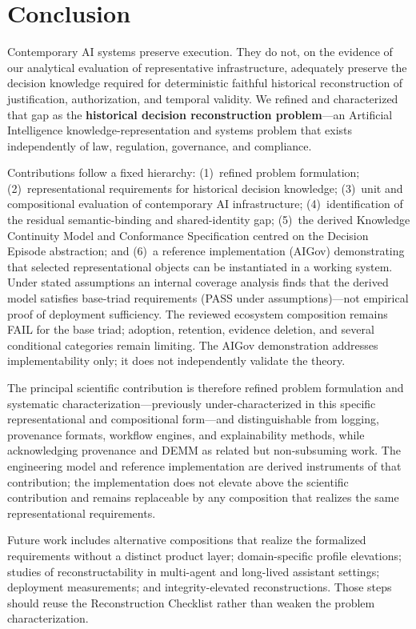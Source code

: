 \documentclass[11pt,a4paper]{article}
\begin{document}
\section{Conclusion}

Contemporary AI systems preserve execution. They do not, on the evidence of our analytical evaluation of representative infrastructure, adequately preserve the decision knowledge required for deterministic faithful historical reconstruction of justification, authorization, and temporal validity. We refined and characterized that gap as the \textbf{historical decision reconstruction problem}---an Artificial Intelligence knowledge-representation and systems problem that exists independently of law, regulation, governance, and compliance.


Contributions follow a fixed hierarchy: (1)~refined problem formulation; (2)~representational requirements for historical decision knowledge; (3)~unit and compositional evaluation of contemporary AI infrastructure; (4)~identification of the residual semantic-binding and shared-identity gap; (5)~the derived Knowledge Continuity Model and Conformance Specification centred on the Decision Episode abstraction; and (6)~a reference implementation (AIGov) demonstrating that selected representational objects can be instantiated in a working system. Under stated assumptions an internal coverage analysis finds that the derived model satisfies base-triad requirements (PASS under assumptions)---not empirical proof of deployment sufficiency. The reviewed ecosystem composition remains FAIL for the base triad; adoption, retention, evidence deletion, and several conditional categories remain limiting. The AIGov demonstration addresses implementability only; it does not independently validate the theory.


The principal scientific contribution is therefore refined problem formulation and systematic characterization---previously under-characterized in this specific representational and compositional form---and distinguishable from logging, provenance formats, workflow engines, and explainability methods, while acknowledging provenance and DEMM as related but non-subsuming work. The engineering model and reference implementation are derived instruments of that contribution; the implementation does not elevate above the scientific contribution and remains replaceable by any composition that realizes the same representational requirements.


Future work includes alternative compositions that realize the formalized requirements without a distinct product layer; domain-specific profile elevations; studies of reconstructability in multi-agent and long-lived assistant settings; deployment measurements; and integrity-elevated reconstructions. Those steps should reuse the Reconstruction Checklist rather than weaken the problem characterization.
\end{document}
